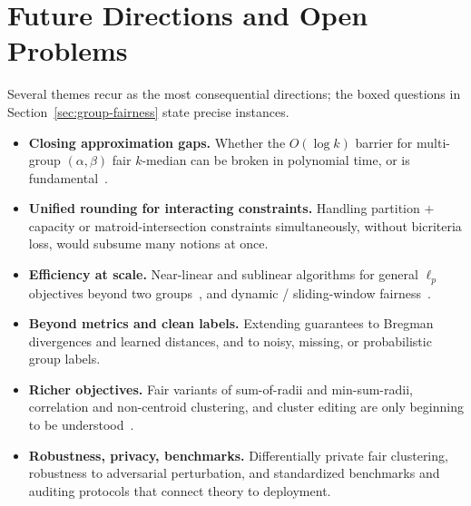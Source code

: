 \section{Future Directions and Open Problems}\label{sec:open}
\aibanner

Several themes recur as the most consequential directions; the boxed questions in Section~\ref{sec:group-fairness} state precise instances.
\begin{itemize}[leftmargin=1.2em]
  \item \textbf{Closing approximation gaps.} Whether the $O(\log k)$ barrier for multi-group $(\alpha,\beta)$ fair $k$-median can be broken in polynomial time, or is fundamental~\citep{DBLP:conf/fat/DaiMV22,bandyapadhyay2024polynomial}.
  \item \textbf{Unified rounding for interacting constraints.} Handling partition $+$ capacity or matroid-intersection constraints simultaneously, without bicriteria loss, would subsume many notions at once.
  \item \textbf{Efficiency at scale.} Near-linear and sublinear algorithms for general $\ell_p$ objectives beyond two groups~\citep{backurs2019scalable}, and dynamic / sliding-window fairness~\citep{cohenfair25}.
  \item \textbf{Beyond metrics and clean labels.} Extending guarantees to Bregman divergences and learned distances, and to noisy, missing, or probabilistic group labels.
  \item \textbf{Richer objectives.} Fair variants of sum-of-radii and min-sum-radii, correlation and non-centroid clustering, and cluster editing are only beginning to be understood~\citep{fairsumradii2025,fptminsumradii2024,unifyingprop2026,modfairclusterediting2021}.
  \item \textbf{Robustness, privacy, benchmarks.} Differentially private fair clustering, robustness to adversarial perturbation, and standardized benchmarks and auditing protocols that connect theory to deployment.
\end{itemize}
